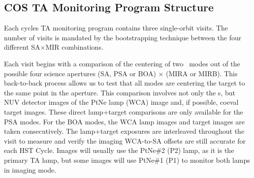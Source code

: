 \subsection{COS TA Monitoring Program Structure}\label{subsec:structure}

Each cycles TA monitoring program contains three single-orbit visits. The number of visits is mandated by the bootstrapping technique between the four different  SA$\times$MIR combinations.

Each visit begins with a comparison of the centering of two ~modes out of the possible four science apertures (SA, PSA or BOA) $\times$ (MIRA or MIRB).
This back-to-back  process allows us to test that all  modes are centering the target to the same point in the aperture.
This comparison involves not only the s, but NUV detector images of the PtNe lamp (WCA) image and, if possible, coeval target images.
These direct lamp+target comparisons are only available for the PSA modes. For the BOA modes, the WCA lamp images and target images are taken consecutively.
The lamp+target exposures are interleaved throughout the visit to measure and verify the imaging WCA-to-SA offsets are still accurate for each HST Cycle.
Images will usually use the PtNe\#2 (P2) lamp, as it is the primary TA lamp, but some images will use PtNe\#1 (P1) to monitor both lamps in imaging mode.

